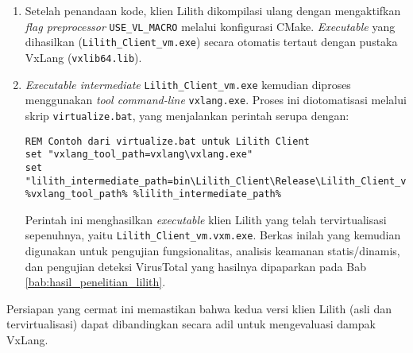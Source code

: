 \begin{enumerate}
    \item {}
    Setelah penandaan kode, klien Lilith dikompilasi ulang dengan mengaktifkan \textit{flag preprocessor} \texttt{USE\_VL\_MACRO} melalui konfigurasi CMake. \textit{Executable} yang dihasilkan (\texttt{Lilith\_Client\_vm.exe}) secara otomatis tertaut dengan pustaka VxLang (\texttt{vxlib64.lib}).

    \item {}
    \textit{Executable intermediate} \texttt{Lilith\_Client\_vm.exe} kemudian diproses menggunakan \textit{tool command-line} \texttt{vxlang.exe}. Proses ini diotomatisasi melalui skrip \texttt{virtualize.bat}, yang menjalankan perintah serupa dengan:
    \begin{listing}[H]
    \begin{verbatim}
REM Contoh dari virtualize.bat untuk Lilith Client
set "vxlang_tool_path=vxlang\vxlang.exe"
set "lilith_intermediate_path=bin\Lilith_Client\Release\Lilith_Client_vm.exe"
%vxlang_tool_path% %lilith_intermediate_path%
    \end{verbatim}
    \label{lst:virtualize_lilith_example_bab4_revised}
    \end{listing}
    Perintah ini menghasilkan \textit{executable} klien Lilith yang telah tervirtualisasi sepenuhnya, yaitu \texttt{Lilith\_Client\_vm.vxm.exe}. Berkas inilah yang kemudian digunakan untuk pengujian fungsionalitas, analisis keamanan statis/dinamis, dan pengujian deteksi VirusTotal yang hasilnya dipaparkan pada Bab \ref{bab:hasil_penelitian_lilith}.
\end{enumerate}

Persiapan yang cermat ini memastikan bahwa kedua versi klien Lilith (asli dan tervirtualisasi) dapat dibandingkan secara adil untuk mengevaluasi dampak VxLang.
